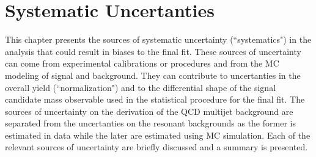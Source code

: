 \chapter{Systematic Uncertanties} \label{chap:systematics}

This chapter presents the sources of systematic uncertainty (``systematics") in
the analysis that could result in biases to the final fit.  These sources of
uncertainty can come from experimental calibrations or procedures and from the
MC modeling of signal and background. They can contribute to uncertanties in
the overall yield (``normalization") and to the differential shape of the
signal candidate mass observable used in the statistical procedure for the
final fit.  The sources of uncertainty on the derivation of the QCD multijet
background are separated from the uncertanties on the resonant backgrounds as
the former is estimated in data while the later are estimated using MC
simulation.  Each of the relevant sources of uncertainty are briefly discussed
and a summary is presented.




